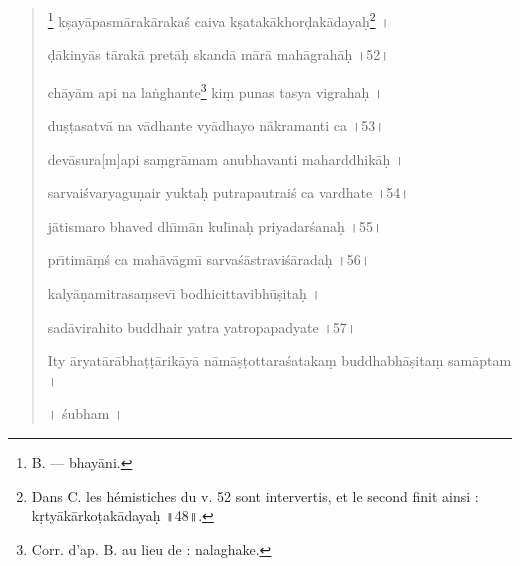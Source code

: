 \documentclass[a4paper, 11pt, oneside, french]{article}
\begin{document}
\begin{quotation}
\bigskip

\footnote{B. --- bhay\={a}ni.} k\d{s}ay\={a}pasm\={a}rak\={a}raka\'{s} caiva k\d{s}atak\={a}khor\d{d}ak\={a}daya\d{h}\footnote{Dans C. les hémistiches du v. 52 sont intervertis, et le second finit ainsi : k\d{r}ty\={a}k\={a}rko\d{t}ak\={a}daya\d{h} \texthindi{॥}48\texthindi{॥}.} \texthindi{।}

\d{d}\={a}kiny\={a}s t\={a}rak\={a} pret\={a}\d{h} skand\={a} m\={a}r\={a} mah\={a}grah\={a}\d{h} \texthindi{।}52\texthindi{।}

\bigskip

ch\={a}y\={a}m api na la\.{n}ghante\footnote{Corr. d'ap. B. au lieu de : nalaghake.} ki\d{m} punas tasya vigraha\d{h} \texthindi{।}

du\d{s}\d{t}asatv\={a} na v\={a}dhante vy\={a}dhayo n\={a}kramanti ca \texthindi{।}53\texthindi{।}

\bigskip

dev\={a}sura[m]api sa\d{m}gr\={a}mam anubhavanti maharddhik\={a}\d{h} \texthindi{।}

sarvai\'{s}varyagu\d{n}air yukta\d{h} putrapautrai\'{s} ca vardhate \texthindi{।}54\texthindi{।}

\bigskip

j\={a}tismaro bhaved dh\={\i}m\={a}n kul\={\i}na\d{h} priyadar\'{s}ana\d{h} \texthindi{।}55\texthindi{।}

\bigskip

pr\={\i}tim\={a}\d{m}\'{s} ca mah\={a}v\={a}gm\={\i} sarva\'{s}\={a}stravi\'{s}\={a}rada\d{h} \texthindi{।}56\texthindi{।}

\bigskip

kaly\={a}\d{n}amitrasa\d{m}sev\={\i} bodhicittavibh\={u}\d{s}ita\d{h} \texthindi{।}

sad\={a}virahito buddhair yatra yatropapadyate \texthindi{।}57\texthindi{।}

\bigskip

Ity \={a}ryat\={a}r\={a}bha\d{t}\d{t}\={a}rik\={a}y\={a} n\={a}m\={a}\d{s}\d{t}ottara\'{s}ataka\d{m} buddhabh\={a}\d{s}ita\d{m} sam\={a}ptam \texthindi{।}

\bigskip

\texthindi{।} \'{s}ubham \texthindi{।}
\end{quotation}
\clearpage
\end{document}
